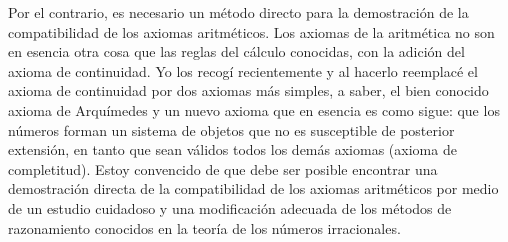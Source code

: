 \documentclass[a4paper, 12pt]{article}
\begin{document}
Por el contrario, es necesario un método directo para la demostración de la compatibilidad de los axiomas aritméticos. Los axiomas de la aritmética no son en esencia otra cosa que las reglas del cálculo conocidas, con la adición del axioma de continuidad. Yo los recogí recientemente y al hacerlo reemplacé el axioma de continuidad por dos axiomas más simples, a saber, el bien conocido axioma de Arquímedes y un nuevo axioma que en esencia es como sigue: que los números forman un sistema de objetos que no es susceptible de posterior extensión, en tanto que sean válidos todos los demás axiomas (axioma de completitud). Estoy convencido de que debe ser posible encontrar una demostración directa de la compatibilidad de los axiomas aritméticos por medio de un estudio cuidadoso y una modificación adecuada de los métodos de razonamiento conocidos en la teoría de los números irracionales. 
\end{document}
